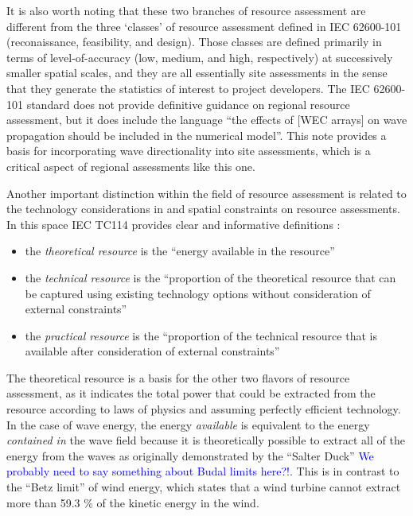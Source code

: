 It is also worth noting that these two branches of resource assessment are different from the three `classes' of resource assessment defined in IEC 62600-101 (reconaissance, feasibility, and design). Those classes are defined primarily in terms of level-of-accuracy (low, medium, and high, respectively) at successively smaller spatial scales, and they are all essentially site assessments in the sense that they generate the statistics of interest to project developers.
The IEC 62600-101 standard does not provide definitive guidance on regional resource assessment, but it does include the language ``the effects of [WEC arrays] on wave propagation should be included in the numerical model''. This note provides a basis for incorporating wave directionality into site assessments, which is a critical aspect of regional assessments like this one.

Another important distinction within the field of resource assessment is related to the technology considerations in and spatial constraints on resource assessments. In this space IEC TC114 provides clear and informative definitions \citep{internationalelectrotechnicalcommissionPartTerminologyEdition2020}:
\begin{itemize}
  \item the {\it theoretical resource} is the ``energy available in the resource''
  \item the {\it technical resource} is the ``proportion of the theoretical resource that can be captured using existing technology options without consideration of external constraints''
  \item the {\it practical resource} is the ``proportion of the technical resource that is available after consideration of external constraints''
\end{itemize}

The theoretical resource is a basis for the other two flavors of resource assessment, as it indicates the total power that could be extracted from the resource according to laws of physics and assuming perfectly efficient technology. In the case of wave energy, the energy {\em available} is equivalent to the energy {\em contained in} the wave field because it is theoretically possible to extract all of the energy from the waves as originally demonstrated by the ``Salter Duck'' \citep{salterRecentProgressDucks1980} \textcolor{blue}{We probably need to say something about Budal limits here?!}. This is in contrast to the ``Betz limit'' of wind energy, which states that a wind turbine cannot extract more than 59.3 \% of the kinetic energy in the wind.

